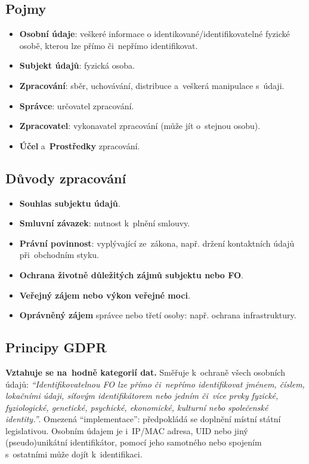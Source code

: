 \subsection*{Pojmy}

\begin{itemize}
    \item \textbf{Osobní údaje}: veškeré informace o identikované/identifikovatelné fyzické osobě, kterou lze přímo či~nepřímo identifikovat.
    \item \textbf{Subjekt údajů}: fyzická osoba.
    \item \textbf{Zpracování}: sběr, uchovávání, distribuce a~veškerá manipulace s~údaji.
    \item \textbf{Správce}: určovatel zpracování.
    \item \textbf{Zpracovatel}: vykonavatel zpracování (může jít o~stejnou osobu).
    \item \textbf{Účel} a~\textbf{Prostředky} zpracování.
\end{itemize}

\subsection*{Důvody zpracování}

\begin{itemize}
    \item \textbf{Souhlas subjektu údajů}.
    \item \textbf{Smluvní závazek}: nutnost k~plnění smlouvy.
    \item \textbf{Právní povinnost}: vyplývající ze~zákona, např. držení kontaktních údajů při~obchodním styku.
    \item \textbf{Ochrana životně důležitých zájmů subjektu nebo FO}.
    \item \textbf{Veřejný zájem nebo výkon veřejné moci}.
    \item \textbf{Oprávněný zájem} správce nebo třetí osoby: např. ochrana infrastruktury.
\end{itemize}

\subsection{Principy GDPR}

\textbf{Vztahuje se na~hodně kategorií dat.} Směřuje k~ochraně všech osobních údajů: \emph{\enquote{Identifikovatelnou FO lze přímo či~nepřímo identifikovat jménem, číslem, lokačními údaji, síťovým identifikátorem nebo jedním či~více prvky fyzické, fyziologické, genetické, psychické, ekonomické, kulturní nebo společenské identity.}}. Omezená \enquote{implementace}: předpokládá se doplnění místní státní legislativou. Osobním údajem je i~IP/MAC adresa, UID nebo jiný (pseudo)unikátní identifikátor, pomocí jeho samotného nebo spojením s~ostatními může dojít k~identifikaci.

